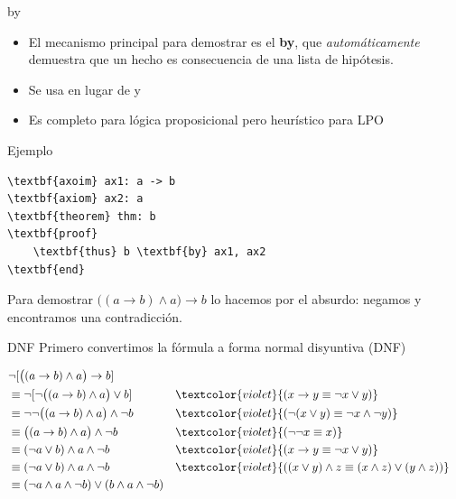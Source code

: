 \documentclass[xcolor={dvipsnames},spanish]{beamer}
\begin{document}
\begin{frame}{by}
    \begin{itemize}
        \item El mecanismo principal para demostrar es el \textbf{by}, que \textit{automáticamente} demuestra que un hecho es consecuencia de una lista de hipótesis.
        \item Se usa en lugar de  y 
        \item Es completo para lógica proposicional pero heurístico para LPO
    \end{itemize}
\end{frame}

\begin{frame}[fragile]{Ejemplo}
\begin{block}{}
\begin{Verbatim}[commandchars=\\\{\}]
\textbf{axoim} ax1: a -> b
\textbf{axiom} ax2: a
\textbf{theorem} thm: b
\textbf{proof}
    \textbf{thus} b \textbf{by} ax1, ax2
\textbf{end}
\end{Verbatim}    
\end{block}

Para demostrar $\big( (a \to b) \wedge a \big) \to b$ lo hacemos por el absurdo: negamos y encontramos una contradicción.
\end{frame}

\begin{frame}[fragile]{DNF}
Primero convertimos la fórmula a forma normal disyuntiva (DNF)

\newcommand{\just}[1]{\textcolor{violet}{(#1)}}

\begin{align*}
    &\neg [ \big( (a \to b) \wedge a \big) \to b ] \\
    &\equiv \neg [ \neg \big( (a \to b) \wedge a \big) \vee b ]
        && \just{x \to y \equiv \neg x \vee y}\\
    &\equiv \neg \neg \big( (a \to b) \wedge a \big) \wedge \neg b
        && \just{\neg(x \vee y) \equiv \neg x \wedge \neg y}\\
    &\equiv \big( (a \to b) \wedge a \big) \wedge \neg b
        && \just{\neg\neg x \equiv x}\\
    &\equiv (\neg a \vee b) \wedge a \wedge \neg b
         && \just{x \to y \equiv \neg x \vee y}\\
    &\equiv (\neg a \vee b) \wedge a \wedge \neg b
        && \just{(x \vee y) \wedge z \equiv (x \wedge z) \vee (y \wedge z) }\\
    &\equiv
        (\neg a \wedge a \wedge \neg b)
        \vee
        (b \wedge a \wedge \neg b)
\end{align*}
\end{frame}
\end{document}
